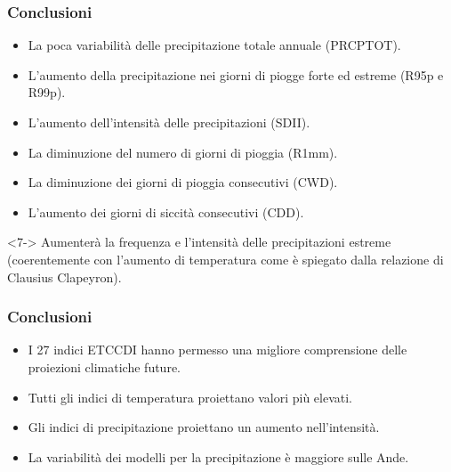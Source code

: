 		
\begin{frame}	
    \frametitle{Conclusioni}
    \begin{itemize}	
    \item<1-> La poca variabilità delle precipitazione totale annuale (PRCPTOT).
    \item<2-> L'aumento della precipitazione nei giorni di piogge forte ed estreme (R95p e R99p).
    	\item<3-> L'aumento dell'intensità delle precipitazioni (SDII). 
	\item<4-> La diminuzione del numero di giorni di pioggia (R1mm).  %
	\item<5-> La diminuzione dei giorni di pioggia consecutivi (CWD).

	\item<6-> L'aumento dei giorni di siccità consecutivi (CDD).
	\end{itemize}

\begin{alertblock}<7->{}
       \setlength\itemsep{0pt}
	  Aumenterà la frequenza e l'intensità delle precipitazioni estreme (coerentemente con l'aumento di temperatura come è spiegato dalla relazione di Clausius Clapeyron).
\end{alertblock}	
\end{frame}	

\begin{frame}
	\frametitle{Conclusioni}
	\begin{itemize}
		\setlength\itemsep{10pt}
		\item<1-> I 27 indici ETCCDI hanno permesso una migliore comprensione delle proiezioni climatiche future.
		\item<2-> Tutti gli indici di temperatura proiettano valori più elevati.
		\item<3-> Gli indici di precipitazione proiettano un aumento nell'intensità.
		\item<4-> La variabilità dei modelli per la precipitazione è maggiore sulle Ande.
    \end{itemize}    
\end{frame}	
	

